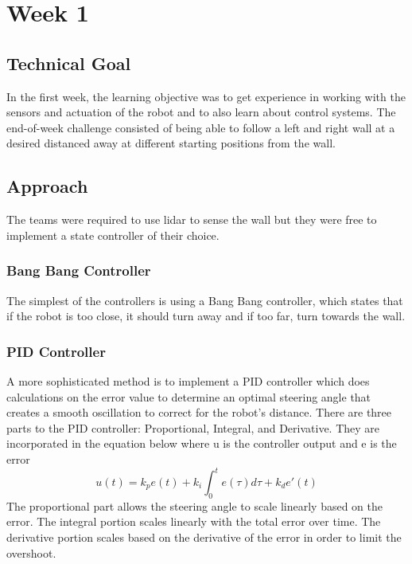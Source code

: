 \documentclass[journal, a4paper]{IEEEtran}
\begin{document}
\section{Week 1}
\subsection{Technical Goal}
In the first week, the learning objective was to get experience in working with the sensors and actuation of the robot and to also learn about control systems. The end-of-week challenge consisted of being able to follow a left and right wall at a desired distanced away at different starting positions from the wall. 
\subsection{Approach}
The teams were required to use lidar to sense the wall but they were free to implement a state controller of their choice.
\subsubsection{Bang Bang Controller}The simplest of the controllers is using a Bang Bang controller, which states that if the robot is too close, it should turn away and if too far, turn towards the wall. 
\subsubsection{PID Controller}A more sophisticated method is to implement a PID controller which does calculations on the error value to determine an optimal steering angle that creates a smooth oscillation to correct for the robot’s distance. There are three parts to the PID controller: Proportional, Integral, and Derivative. They are incorporated in the equation below where u is the controller output and e is the error
\begin{equation}
u(t) = k_{p}e(t)+k_i\int_{0}^{t}e(\tau)d\tau + k_{d}e'(t)
\end{equation}
The proportional part allows the steering angle to scale linearly based on the error. The integral portion scales linearly with the total error over time. The derivative portion scales based on the derivative of the error in order to limit the overshoot. \cite{pid-mit}
\end{document}
